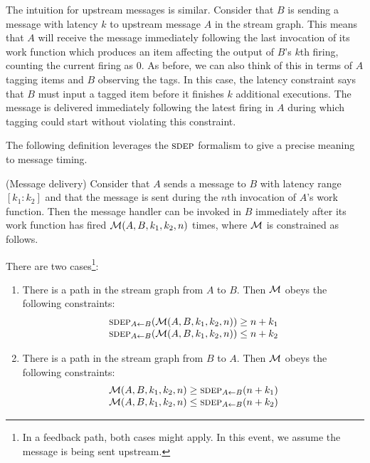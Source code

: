 The intuition for upstream messages is similar.  Consider that $B$ is
sending a message with latency $k$ to upstream message $A$ in the
stream graph.  This means that $A$ will receive the message
immediately following the last invocation of its work function which
produces an item affecting the output of $B$'s $k$th firing, counting
the current firing as 0.  As before, we can also think of this in
terms of $A$ tagging items and $B$ observing the tags.  In this case,
the latency constraint says that $B$ must input a tagged item before
it finishes $k$ additional executions.  The message is delivered
immediately following the latest firing in $A$ during which tagging
could start without violating this constraint.

The following definition leverages the $\textsc{sdep}$ formalism to give a
precise meaning to message timing.

\begin{definition}(Message delivery)
Consider that $A$ sends a message to $B$ with latency range
$[k_1:k_2]$ and that the message is sent during the $n$th invocation
of $A$'s work function.  Then the message handler can be invoked in
$B$ immediately after its work function has fired ${\cal M}(A, B, k_1,
k_2, n)$ times, where ${\cal M}$ is constrained as follows.

There are two cases\footnote{In a feedback path, both cases might apply.  In this event, we assume the message is being sent upstream.}:
\begin{enumerate}

\item There is a path in the stream graph from $A$ to $B$.  Then
${\cal M}$ obeys the following constraints:
\[
\begin{array}{l}
\sdepf{A}{B}({\cal M}(A, B, k_1, k_2, n)) \ge n+k_1\\
\sdepf{A}{B}({\cal M}(A, B, k_1, k_2, n)) \le n+k_2
\end{array}
\]

\item There is a path in the stream graph from $B$ to $A$.  Then
${\cal M}$ obeys the following constraints:
\[
\begin{array}{l}
{\cal M}(A, B, k_1, k_2, n) \ge \sdepf{A}{B}(n + k_1)\\
{\cal M}(A, B, k_1, k_2, n) \le \sdepf{A}{B}(n + k_2)
\end{array}
\]
\end{enumerate}
\end{definition}

